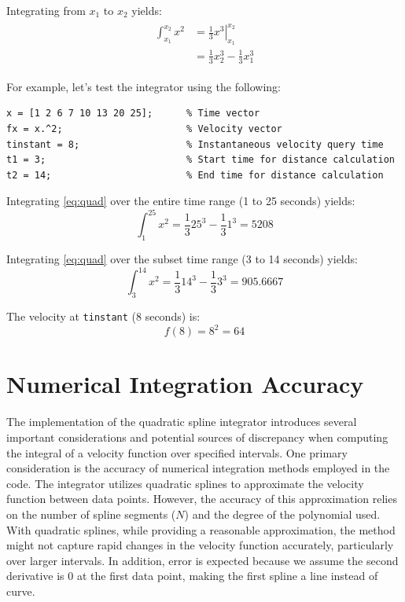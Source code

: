 \documentclass{article}
\newcommand{\mat}[1]{\lstinline[style=matlabstyle]|#1|}
\begin{document}
Integrating from $x_1$ to $x_2$ yields:
\begin{align*}
    \begin{split}
        \int_{x_1}^{x_2} x^2 & = \left.\frac{1}{3} x^3\right|_{x_1}^{x_2} \\
                             & = \frac{1}{3} x_2^3 - \frac{1}{3} x_1^3
    \end{split}
\end{align*}

For example, let's test the integrator using the following:
\begin{lstlisting}[style=matlabstyle, caption = {Integrator Inputs}]
x = [1 2 6 7 10 13 20 25];      % Time vector
fx = x.^2;                      % Velocity vector
tinstant = 8;                   % Instantaneous velocity query time
t1 = 3;                         % Start time for distance calculation
t2 = 14;                        % End time for distance calculation
\end{lstlisting}

Integrating \eqref{eq:quad} over the entire time range (1 to 25 seconds) yields:
\begin{equation*}
    \int_{1}^{25} x^2 = \frac{1}{3} 25^3 - \frac{1}{3} 1^3 = 5208
\end{equation*}

Integrating \eqref{eq:quad} over the subset time range (3 to 14 seconds) yields:
\begin{equation*}
    \int_{3}^{14} x^2 = \frac{1}{3} 14^3 - \frac{1}{3} 3^3 = 905.6667
\end{equation*}

The velocity at \mat{tinstant} (8 seconds) is:
\begin{equation*}
    f(8) = 8^2 = 64 
\end{equation*}

\pagebreak

\section{Numerical Integration Accuracy}
The implementation of the quadratic spline integrator introduces several important considerations and potential sources of discrepancy when computing the integral of a velocity function over specified intervals. One primary consideration is the accuracy of numerical integration methods employed in the code. The integrator utilizes quadratic splines to approximate the velocity function between data points. However, the accuracy of this approximation relies on the number of spline segments ($N$) and the degree of the polynomial used. With quadratic splines, while providing a reasonable approximation, the method might not capture rapid changes in the velocity function accurately, particularly over larger intervals. In addition, error is expected because we assume the second derivative is 0 at the first data point, making the first spline a line instead of curve. \\
\end{document}
